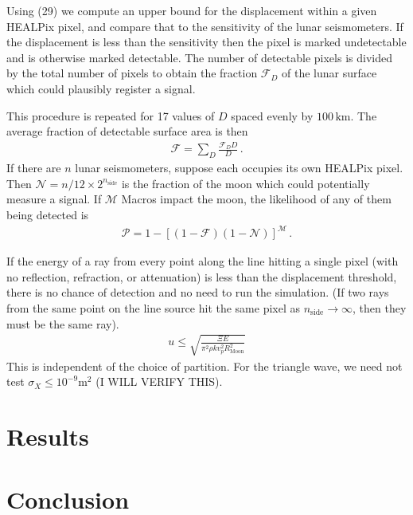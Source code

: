 \documentclass[prd,reprint,10pt,tightenlines]{revtex4-1}
\newcommand*\scr[1]{\mathscr{#1}}
\newcommand*\te[1]{\text{#1}}
\newcommand*\ps[1]{\left[#1\right]}
\newcommand*\f[2]{\frac{#1}{#2}}
\begin{document}
Using (29) we compute an upper bound for the displacement within a given HEALPix pixel, and compare that to the sensitivity of the lunar seismometers. If the displacement is less than the sensitivity then the pixel is marked undetectable and is otherwise marked detectable. The number of detectable pixels is divided by the total number of pixels to obtain the fraction $\scr F_D$ of the lunar surface which could plausibly register a signal. 

This procedure is repeated for 17 values of $D$ spaced evenly by $100\,\te{km}$. The average fraction of detectable surface area is then
\begin{align}
\scr F = \sum_D\f{\scr F_D D}{D}\,.
\end{align}
If there are $n$ lunar seismometers, suppose each occupies its own HEALPix pixel. Then $\scr N = n/12\times 2^{n_\te{side}}$ is the fraction of the moon which could potentially measure a signal. If $\scr M$ Macros impact the moon, the likelihood of any of them being detected is
\begin{align}
\scr P = 1-\ps{(1-\scr F)(1-\scr N)}^\scr M\,.
\end{align}

If the energy of a ray from every point along the line hitting a single pixel (with no reflection, refraction, or attenuation) is less than the displacement threshold, there is no chance of detection and no need to run the simulation. (If two rays from the same point on the line source hit the same pixel as $n_\te{side}\to\infty$, then they must be the same ray).
\begin{align}
u\leq\sqrt{\f{\Xi E}{\pi^2\rho k v_p^2 R_\te{Moon}^2}}
\end{align}
This is independent of the choice of partition. For the triangle wave, we need not test $\sigma_X\leq10^{-9}\te{m}^2$ (I WILL VERIFY THIS).
\section{Results}

\section{Conclusion}
\end{document}
